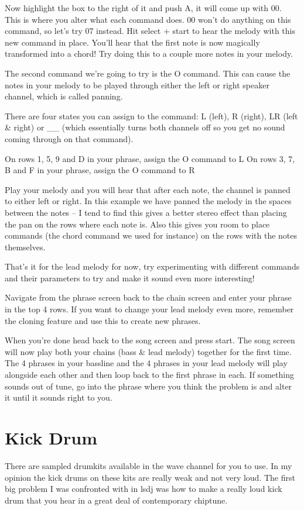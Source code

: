 \documentclass[]{article}
\begin{document}
Now highlight the box to the right of it and push A, it will come up with 00. This is where you alter what each command does. 00 won’t do anything on this command, so let’s try 07 instead. Hit select + start to hear the melody with this new command in place. You’ll hear that the first note is now magically transformed into a chord! Try doing this to a couple more notes in your melody.

The second command we’re going to try is the O command. This can cause the notes in your melody to be played through either the left or right speaker channel, which is called panning.

There are four states you can assign to the command: L (left), R (right), LR (left \& right) or \_\_ (which essentially turns both channels off so you get no sound coming through on that command).

On rows 1, 5, 9 and D in your phrase, assign the O command to L On rows 3, 7, B and F in your phrase, assign the O command to R

Play your melody and you will hear that after each note, the channel is panned to either left or right. In this example we have panned the melody in the spaces between the notes – I tend to find this gives a better stereo effect than placing the pan on the rows where each note is. Also this gives you room to place commands (the chord command we used for instance) on the rows with the notes themselves.

That’s it for the lead melody for now, try experimenting with different commands and their parameters to try and make it sound even more interesting!

Navigate from the phrase screen back to the chain screen and enter your phrase in the top 4 rows. If you want to change your lead melody even more, remember the cloning feature and use this to create new phrases.

When you’re done head back to the song screen and press start. The song screen will now play both your chains (bass \& lead melody) together for the first time. The 4 phrases in your bassline and the 4 phrases in your lead melody will play alongside each other and then loop back to the first phrase in each. If something sounds out of tune, go into the phrase where you think the problem is and alter it until it sounds right to you.

\section{Kick Drum}
There are sampled drumkits available in the wave channel for you to use. In my opinion the kick drums on these kits are really weak and not very loud. The first big problem I was confronted with in lsdj was how to make a really loud kick drum that you hear in a great deal of contemporary chiptune.
\end{document}
